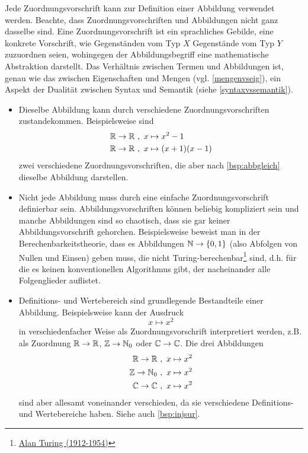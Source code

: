 \begin{bem} \label{zuordvsabb}
    Jede Zuordnungsvorschrift kann zur Definition einer Abbildung verwendet werden. Beachte, dass Zuordnungsvorschriften und Abbildungen nicht ganz dasselbe sind. Eine Zuordnungsvorschrift ist ein sprachliches Gebilde, eine konkrete Vorschrift, wie Gegenständen vom Typ $X$ Gegenstände vom Typ $Y$ zuzuordnen seien, wohingegen der Abbildungsbegriff eine mathematische Abstraktion darstellt. Das Verhältnis zwischen Termen und Abbildungen ist, genau wie das zwischen Eigenschaften und Mengen (vgl. \cref{mengenvseig}), ein Aspekt der Dualität zwischen Syntax und Semantik (siehe \cref{syntaxvssemantik}).
    \begin{itemize}
        \item Dieselbe Abbildung kann durch verschiedene Zuordnungsvorschriften zustandekommen. Beispielsweise sind
        \begin{align*}
            \mathbb R \to \mathbb R \ &,\ x\mapsto x^2-1 \\
            \mathbb R \to \mathbb R \ &,\ x\mapsto (x+1)(x-1)
        \end{align*}
        zwei verschiedene Zuordnungsvorschriften, die aber nach \cref{bsp:abbgleich} dieselbe Abbildung darstellen.
        \item Nicht jede Abbildung muss durch eine einfache Zuordnungsvorschrift definierbar sein. Abbildungsvorschriften können beliebig kompliziert sein und manche Abbildungen sind so chaotisch, dass sie gar keiner Abbildungsvorschrift gehorchen. Beispielsweise beweist man in der Berechenbarkeitstheorie, dass es Abbildungen $\mathbb N \to \{0,1\}$ (also Abfolgen von Nullen und Einsen) geben muss, die nicht Turing-berechenbar\footnote{\href{https://de.wikipedia.org/wiki/Alan_Turing}{Alan Turing (1912-1954)}} sind, d.h. für die es keinen konventionellen Algorithmus gibt, der nacheinander alle Folgenglieder auflistet.
        \item Definitions- und Wertebereich sind grundlegende Bestandteile einer Abbildung. Beispielsweise kann der Ausdruck
            \[ x\mapsto x^2 \]
        in verschiedenfacher Weise als Zuordnungsvorschrift interpretiert werden, z.B. als Zuordnung $\mathbb R\to \mathbb R$, $\mathbb Z\to \mathbb N_0$ oder $\mathbb C\to \mathbb C$. Die drei Abbildungen
        \begin{align*}
            \mathbb R \to \mathbb R \ & ,\ x\mapsto x^2 \\
            \mathbb Z \to \mathbb N_0 \ & ,\ x\mapsto x^2 \\
            \mathbb C \to \mathbb C \ &,\ x\mapsto x^2 
        \end{align*}
        sind aber allesamt voneinander verschieden, da sie verschiedene Definitions- und Wertebereiche haben. Siehe auch \cref{bsp:injsur}.
    \end{itemize}
\end{bem}



